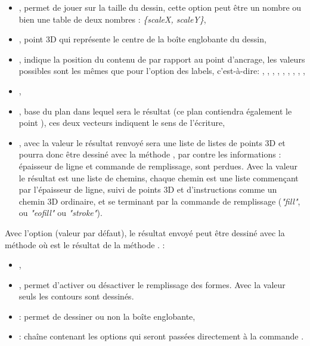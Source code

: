 \begin{itemize}
    \item {}, permet de jouer sur la taille du dessin, cette option peut être un nombre ou bien une table de deux nombres : \emph{\{scaleX, scaleY\}},
    
    \item {}, point 3D qui représente le centre de la boîte englobante du dessin,
    
    \item {}, indique la position du contenu de  par rapport au point d'ancrage, les valeurs possibles sont les mêmes que pour l'option  des labels, c'est-à-dire: , , , , , , , , ,
    
    \item {},
    
    \item {}, base du plan dans lequel sera le résultat (ce plan contiendra également le point ), ces deux vecteurs indiquent le sens de l'écriture,
    
    \item {}, avec la valeur \true le résultat renvoyé sera une liste de listes de points 3D et pourra donc être dessiné avec la méthode , par contre les informations : épaisseur de ligne et commande de remplissage, sont perdues. Avec la valeur \false le résultat est une liste de chemins, chaque chemin est une liste commençant par l'épaisseur de ligne, suivi de points 3D et d'instructions comme un chemin 3D ordinaire, et se terminant par la commande de remplissage (\emph{"fill"}, ou \emph{"eofill"} ou \emph{"stroke"}).
\end{itemize}

Avec l'option  (valeur par défaut), le résultat envoyé peut être dessiné avec la méthode  où  est le résultat de la méthode . \writeoptions :

\begin{itemize}
    \item {},
    \item {}, permet d'activer ou désactiver le remplissage des formes. Avec la valeur \true seuls les contours sont dessinés.
    \item {} : permet de dessiner ou non la boîte englobante,
    \item {} : chaîne contenant les options qui seront passées directement à la commande \drawcmd.
\end{itemize}

